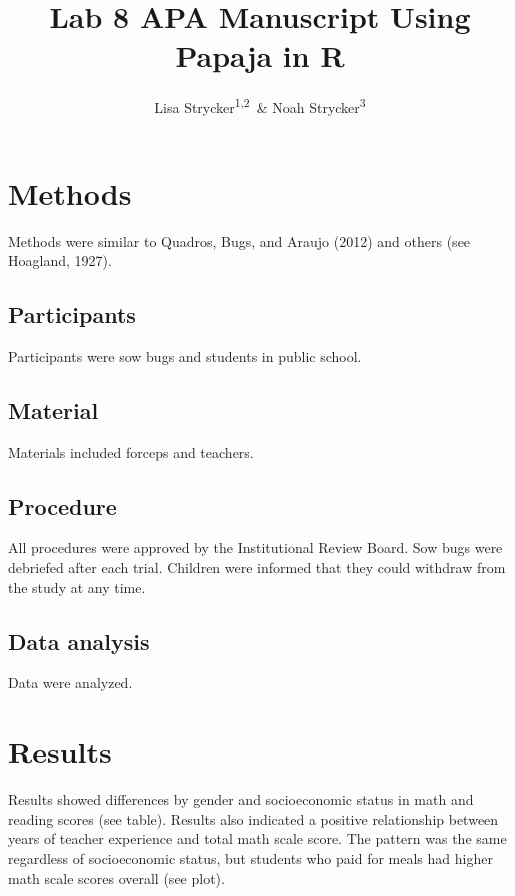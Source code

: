 \documentclass[man]{apa6}
\title{Lab 8 APA Manuscript Using Papaja in R}
\author{Lisa Strycker\textsuperscript{1,2}~\& Noah Strycker\textsuperscript{3}}
\date{}
\affiliation{
\vspace{0.5cm}
\textsuperscript{1} Oregon Research Institute\\\textsuperscript{2} University of Oregon\\\textsuperscript{3} Stony Brook University}
\begin{document}
\maketitle

\hypertarget{methods}{%
\section{Methods}\label{methods}}

Methods were similar to Quadros, Bugs, and Araujo (2012) and others (see Hoagland, 1927).

\hypertarget{participants}{%
\subsection{Participants}\label{participants}}

Participants were sow bugs and students in public school.

\hypertarget{material}{%
\subsection{Material}\label{material}}

Materials included forceps and teachers.

\hypertarget{procedure}{%
\subsection{Procedure}\label{procedure}}

All procedures were approved by the Institutional Review Board. Sow bugs were debriefed after each trial. Children were informed that they could withdraw from the study at any time.

\hypertarget{data-analysis}{%
\subsection{Data analysis}\label{data-analysis}}

Data were analyzed.

\hypertarget{results}{%
\section{Results}\label{results}}

Results showed differences by gender and socioeconomic status in math and reading scores (see table). Results also indicated a positive relationship between years of teacher experience and total math scale score. The pattern was the same regardless of socioeconomic status, but students who paid for meals had higher math scale scores overall (see plot).
\end{document}
